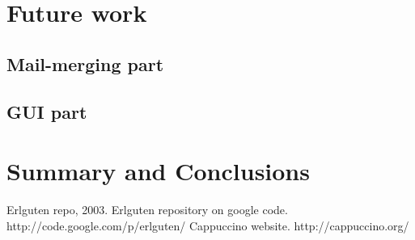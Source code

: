 \documentclass{report}
\begin{document}
\chapter{Future work}
\section{Mail-merging part}
\section{GUI part}

\chapter{Summary and Conclusions}

\begin{thebibliography}{9}
Erlguten repo, 2003. Erlguten repository on google code. http://code.google.com/p/erlguten/
 Cappuccino website. http://cappuccino.org/
\end{thebibliography}
\end{document}

